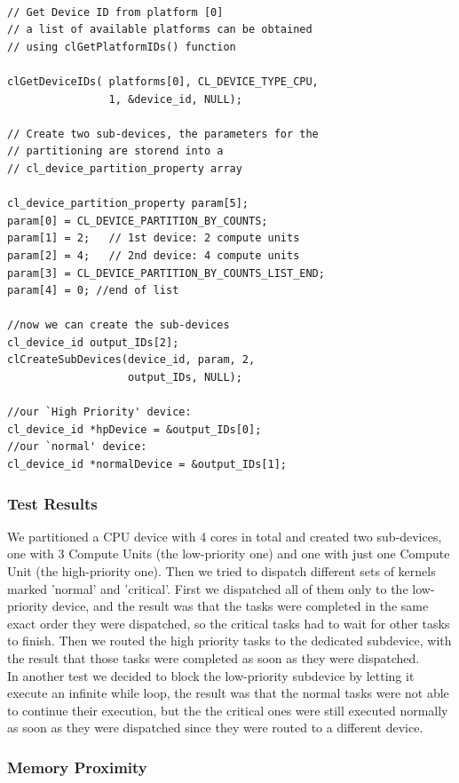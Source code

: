 {\footnotesize\begin{verbatim}

// Get Device ID from platform [0]
// a list of available platforms can be obtained
// using clGetPlatformIDs() function

clGetDeviceIDs( platforms[0], CL_DEVICE_TYPE_CPU,
                1, &device_id, NULL);
								
// Create two sub-devices, the parameters for the
// partitioning are storend into a 
// cl_device_partition_property array

cl_device_partition_property param[5];
param[0] = CL_DEVICE_PARTITION_BY_COUNTS;
param[1] = 2;   // 1st device: 2 compute units
param[2] = 4; 	// 2nd device: 4 compute units
param[3] = CL_DEVICE_PARTITION_BY_COUNTS_LIST_END;
param[4] = 0; //end of list

//now we can create the sub-devices
cl_device_id output_IDs[2]; 
clCreateSubDevices(device_id, param, 2,
                   output_IDs, NULL);
									
//our `High Priority' device:
cl_device_id *hpDevice = &output_IDs[0];  
//our `normal' device:    
cl_device_id *normalDevice = &output_IDs[1]; 

\end{verbatim}}

\subsubsection*{Test Results}
We partitioned a CPU device with 4 cores in total and created two sub-devices, one with 3 Compute Units (the low-priority one) and one with just one Compute Unit (the high-priority one). Then we tried to dispatch different sets of kernels marked 'normal' and 'critical'. First we dispatched all of them only to the low-priority device, and the result was that the tasks were completed in the same exact order they were dispatched, so the critical tasks had to wait for other tasks to finish. Then we routed the high priority tasks to the dedicated subdevice, with the result that those tasks were completed as soon as they were dispatched.\\
In another test we decided to block the low-priority subdevice by letting it execute an infinite while loop, the result was that the normal tasks were not able to continue their execution, but the the critical ones were still executed normally as soon as they were dispatched since they were routed to a different device.


\subsubsection{Memory Proximity} \label{sect:memproximity}

